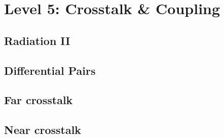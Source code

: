 
\section{Level 5: Crosstalk \& Coupling}

\subsection{Radiation II}


\subsection{Differential Pairs}

\subsection{Far crosstalk}

\subsection{Near crosstalk}
